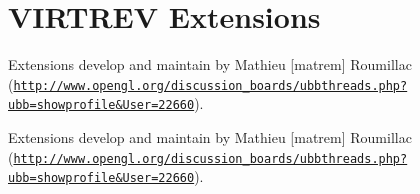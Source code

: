 \hypertarget{group__virtrev}{\section{V\-I\-R\-T\-R\-E\-V Extensions}
\label{group__virtrev}
}


Extensions develop and maintain by Mathieu \mbox{[}matrem\mbox{]} Roumillac (\href{http://www.opengl.org/discussion_boards/ubbthreads.php?ubb=showprofile&User=22660}{\tt http\-://www.\-opengl.\-org/discussion\-\_\-boards/ubbthreads.\-php?ubb=showprofile\&\-User=22660}).  


Extensions develop and maintain by Mathieu \mbox{[}matrem\mbox{]} Roumillac (\href{http://www.opengl.org/discussion_boards/ubbthreads.php?ubb=showprofile&User=22660}{\tt http\-://www.\-opengl.\-org/discussion\-\_\-boards/ubbthreads.\-php?ubb=showprofile\&\-User=22660}). 